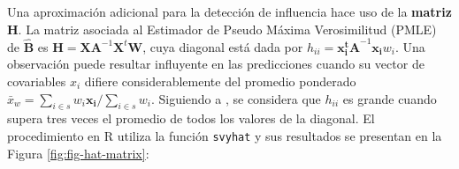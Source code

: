 \documentclass[
  spanish,
  12pt,
]{book}
\newenvironment{Shaded}{\begin{snugshade}}{\end{snugshade}}
\newcommand{\AttributeTok}[1]{\textcolor[rgb]{0.13,0.29,0.53}{#1}}
\newcommand{\ConstantTok}[1]{\textcolor[rgb]{0.56,0.35,0.01}{#1}}
\newcommand{\DecValTok}[1]{\textcolor[rgb]{0.00,0.00,0.81}{#1}}
\newcommand{\FunctionTok}[1]{\textcolor[rgb]{0.13,0.29,0.53}{\textbf{#1}}}
\newcommand{\NormalTok}[1]{#1}
\newcommand{\OtherTok}[1]{\textcolor[rgb]{0.56,0.35,0.01}{#1}}
\newcommand{\SpecialCharTok}[1]{\textcolor[rgb]{0.81,0.36,0.00}{\textbf{#1}}}
\newcommand{\StringTok}[1]{\textcolor[rgb]{0.31,0.60,0.02}{#1}}
\begin{document}
Una aproximación adicional para la detección de influencia hace uso de la \textbf{matriz H}. La matriz asociada al Estimador de Pseudo Máxima Verosimilitud (PMLE) de \(\hat{\boldsymbol{B}}\) es \(\boldsymbol{H}=\boldsymbol{XA}^{-1}\boldsymbol{X}^{t}\boldsymbol{W}\), cuya diagonal está dada por \(h_{ii} = \boldsymbol{x_{i}^t A}^{-1}\boldsymbol{x_{i}}w_{i}\). Una observación puede resultar influyente en las predicciones cuando su vector de covariables \(x_i\) difiere considerablemente del promedio ponderado \(\bar{x}_w=\sum_{i\in s}w_{i}\boldsymbol{x_{i}}\big/\sum_{i\in s}w_i\). Siguiendo a \citet{tellez2015estadistica}, se considera que \(h_{ii}\) es grande cuando supera tres veces el promedio de todos los valores de la diagonal. El procedimiento en R utiliza la función \texttt{svyhat} y sus resultados se presentan en la Figura \ref{fig:fig-hat-matrix}:

\begin{Shaded}
\end{Shaded}
\end{document}
